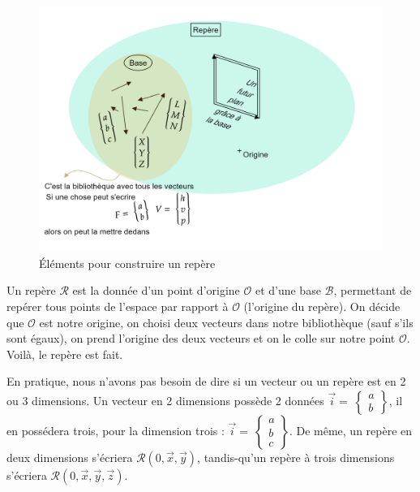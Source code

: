 \documentclass[
	11pt, %
	fleqn, %
	a4paper, %
]{LegrandOrangeBook}
\begin{document}
\begin{figure}[H] %
	\centering %
	\includegraphics[width=1.1\textwidth]{Images/vect1.png} %
	\caption{Éléments pour construire un repère}
	\label{vect1} %
\end{figure}


Un repère $\mathcal{R}$ est la donnée d’un point d'origine $\mathcal{O}$ et d’une base $\mathcal{B}$, permettant de repérer tous points de
l’espace par rapport à $\mathcal{O}$ (l'origine du repère). On décide que $\mathcal{O}$ est notre origine, on choisi deux vecteurs dans notre bibliothèque (sauf s'ils sont égaux), on prend l'origine des deux vecteurs et on le colle sur notre point $\mathcal{O}$. Voilà, le repère est fait. \\

\begin{remark}
    En pratique, nous n'avons pas besoin de dire si un vecteur ou un repère est en 2 ou 3 dimensions. Un vecteur en 2 dimensions possède 2 données $\Vec{i}=\ \begin{Bmatrix} a\\ b \end{Bmatrix} $, il en possédera trois, pour la dimension trois : $\Vec{i}=\ \begin{Bmatrix} a\\ b \\ c \end{Bmatrix} $. De même, un repère en deux dimensions s'écriera $\mathcal{R}(0, \Vec{x}, \Vec{y})$, tandis-qu'un repère à trois dimensions s'écriera $\mathcal{R}(0, \Vec{x}, \Vec{y}, \Vec{z})$.    
\end{remark}
\end{document}
